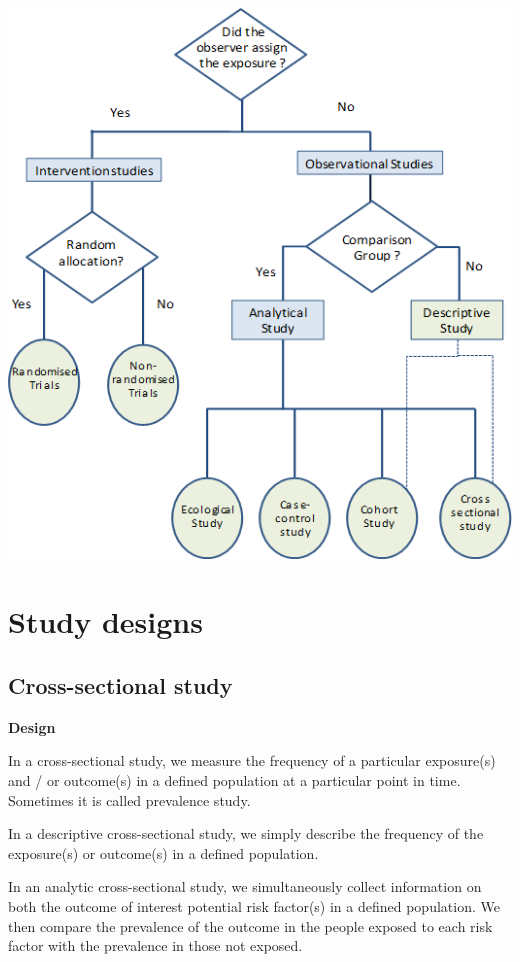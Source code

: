 \documentclass[
  letterpaper,
  DIV=11,
  numbers=noendperiod]{scrreprt}
\begin{document}
\includegraphics{./images/study_types.gif}

\part{Study designs}

\hypertarget{cross-sectional-study}{%
\chapter{Cross-sectional study}\label{cross-sectional-study}}

\textbf{Design}

In a cross-sectional study, we measure the frequency of a particular
exposure(s) and / or outcome(s) in a defined population at a particular
point in time. Sometimes it is called prevalence study.

In a descriptive cross-sectional study, we simply describe the frequency
of the exposure(s) or outcome(s) in a defined population.

In an analytic cross-sectional study, we simultaneously collect
information on both the outcome of interest potential risk factor(s) in
a defined population. We then compare the prevalence of the outcome in
the people exposed to each risk factor with the prevalence in those not
exposed.
\end{document}
